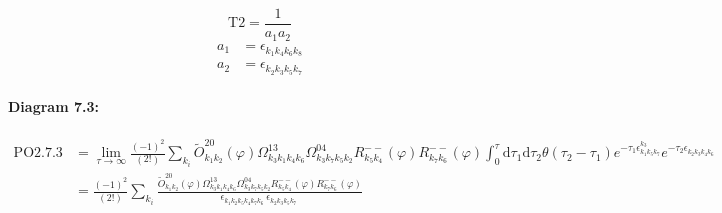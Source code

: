 \documentclass[10pt,a4paper]{article}
\begin{document}
\begin{equation}
\text{T}2 = \frac{1}{a_1a_2}\end{equation}
\begin{align*}
a_1 &= \epsilon^{}_{k_{1}k_{4}k_{6}k_{8}}\\
a_2 &= \epsilon^{}_{k_{2}k_{3}k_{5}k_{7}}
\end{align*}
\paragraph{Diagram 7.3:}
\begin{align}
\text{PO}2.7.3
&= \lim\limits_{\tau \to \infty}\frac{(-1)^2 }{(2!)}\sum_{k_i}\tilde{O}^{20}_{k_{1}k_{2}} (\varphi) \Omega^{13}_{k_{3}k_{1}k_{4}k_{6}} \Omega^{04}_{k_{3}k_{7}k_{5}k_{2}} R^{--}_{k_{5}k_{4}}(\varphi) R^{--}_{k_{7}k_{6}}(\varphi)\int_{0}^{\tau}\mathrm{d}\tau_1\mathrm{d}\tau_2\theta(\tau_2-\tau_1) e^{-\tau_1 \epsilon^{k_{3}}_{k_{1}k_{5}k_{7}}}e^{-\tau_2 \epsilon^{}_{k_{2}k_{3}k_{4}k_{6}}}
 \nonumber \\
&= \frac{(-1)^2 }{(2!)}\sum_{k_i}\frac{\tilde{O}^{20}_{k_{1}k_{2}} (\varphi) \Omega^{13}_{k_{3}k_{1}k_{4}k_{6}} \Omega^{04}_{k_{3}k_{7}k_{5}k_{2}} R^{--}_{k_{5}k_{4}}(\varphi) R^{--}_{k_{7}k_{6}}(\varphi)}{\epsilon^{}_{k_{1}k_{2}k_{5}k_{4}k_{7}k_{6}}\ \epsilon^{}_{k_{2}k_{3}k_{5}k_{7}}\ } 
\end{align}
\end{document}
